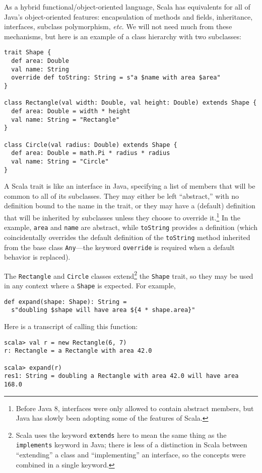 As a hybrid functional/object-oriented language, Scala has equivalents for all of Java's object-oriented features: encapsulation of methods and fields, inheritance, interfaces,  subclass polymorphism, \textit{etc}. We will not need much from these mechanisms, but here is an example of a class hierarchy with two subclasses:
\begin{verbatim}
trait Shape {
  def area: Double
  val name: String
  override def toString: String = s"a $name with area $area"
}

class Rectangle(val width: Double, val height: Double) extends Shape {
  def area: Double = width * height
  val name: String = "Rectangle"
}

class Circle(val radius: Double) extends Shape {
  def area: Double = math.Pi * radius * radius
  val name: String = "Circle"
}
\end{verbatim}
A Scala trait is like an interface in Java, specifying a list of members that will be common to all of its subclasses. They may either be left ``abstract,'' with no definition bound to the name in the trait, or they may have a (default) definition that will be inherited by subclasses unless they choose to override it.\footnote{Before Java 8, interfaces were only allowed to contain abstract members, but Java has slowly been adopting some of the features of Scala.} In the example, \texttt{area} and \texttt{name} are abstract, while \texttt{toString} provides a definition (which coincidentally overrides the default definition of the \texttt{toString} method inherited from the base class \texttt{Any}---the keyword \texttt{override} is required when a default behavior is replaced).

The \texttt{Rectangle} and \texttt{Circle} classes extend\footnote{Scala uses the keyword \texttt{extends} here to mean the same thing as the \texttt{implements} keyword in Java; there is less of a distinction in Scala between ``extending'' a class and ``implementing'' an interface, so the concepts were combined in a single keyword.} the \texttt{Shape} trait, so they may be used in any context where a \texttt{Shape} is expected. For example,
\begin{verbatim}
def expand(shape: Shape): String =
  s"doubling $shape will have area ${4 * shape.area}"
\end{verbatim}
Here is a transcript of calling this function:
\begin{verbatim}
scala> val r = new Rectangle(6, 7)
r: Rectangle = a Rectangle with area 42.0

scala> expand(r)
res1: String = doubling a Rectangle with area 42.0 will have area 168.0
\end{verbatim}

